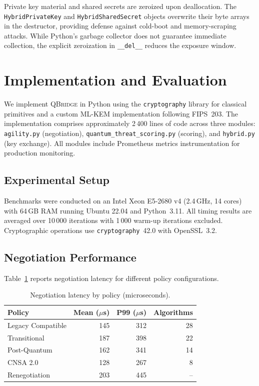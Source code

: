 \documentclass[conference,10pt]{IEEEtran}
\newcommand{\system}{\textsc{QBridge}}
\begin{document}
Private key material and shared secrets are zeroized upon deallocation.
The \texttt{HybridPrivateKey} and \texttt{HybridSharedSecret} objects
overwrite their byte arrays in the destructor, providing defense against
cold-boot and memory-scraping attacks. While Python's garbage collector
does not guarantee immediate collection, the explicit zeroization in
\texttt{\_\_del\_\_} reduces the exposure window.

\section{Implementation and Evaluation}\label{sec:eval}

We implement \system{} in Python using the \texttt{cryptography} library
for classical primitives and a custom ML-KEM implementation following
FIPS~203. The implementation comprises approximately 2\,400 lines of
code across three modules: \texttt{agility.py} (negotiation),
\texttt{quantum\_threat\_scoring.py} (scoring), and \texttt{hybrid.py}
(key exchange). All modules include Prometheus metrics instrumentation
for production monitoring.

\subsection{Experimental Setup}

Benchmarks were conducted on an Intel Xeon E5-2680 v4 (2.4\,GHz,
14 cores) with 64\,GB RAM running Ubuntu 22.04 and Python~3.11.
All timing results are averaged over 10\,000 iterations with 1\,000
warm-up iterations excluded. Cryptographic operations use
\texttt{cryptography}~42.0 with OpenSSL~3.2.

\subsection{Negotiation Performance}

Table~\ref{tab:negotiation-perf} reports negotiation latency for
different policy configurations.

\begin{table}[t]
\centering
\caption{Negotiation latency by policy (microseconds).}
\label{tab:negotiation-perf}
\footnotesize
\begin{tabular}{@{}lrrr@{}}
\toprule
\textbf{Policy} & \textbf{Mean ($\mu$s)} & \textbf{P99 ($\mu$s)} & \textbf{Algorithms} \\
\midrule
Legacy Compatible  & 145 & 312  & 28 \\
Transitional       & 187 & 398  & 22 \\
Post-Quantum       & 162 & 341  & 14 \\
CNSA 2.0           & 128 & 267  & 8  \\
\midrule
Renegotiation      & 203 & 445  & -- \\
\bottomrule
\end{tabular}
\end{table}
\end{document}
